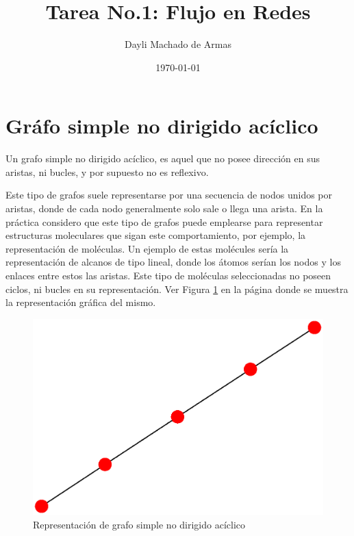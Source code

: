 \documentclass{article}
\begin{document}
\title{Tarea No.1: Flujo en Redes}
\author{Dayli Machado de Armas}
\date{\today}
\maketitle

\section{Gráfo simple no dirigido acíclico}

Un grafo simple no dirigido acíclico, es aquel que no posee dirección en sus aristas, ni bucles, y por supuesto no es reflexivo.\cite{Elisa}

Este tipo de grafos suele representarse por una secuencia de nodos unidos por aristas, donde de cada nodo generalmente solo sale o llega una arista.\cite{Net} En la práctica considero que este tipo de grafos puede emplearse para representar estructuras moleculares que sigan este comportamiento, por ejemplo, la representación de moléculas. Un ejemplo de estas molécules sería la representación de alcanos de tipo lineal, donde los átomos serían los nodos y los enlaces entre estos las aristas. Este tipo de moléculas seleccionadas no poseen ciclos, ni bucles en su representación.  Ver Figura \ref{fig:Fig01} en la página \pageref{fig:Fig01} donde se muestra la representación gráfica del mismo. 




\begin{figure}
    \centering
    \includegraphics[scale=0.4]{imagenes/Fig01.eps}
    \caption{Representación de grafo simple no dirigido acíclico}
    \label{fig:Fig01}
\end{figure}
\end{document}
